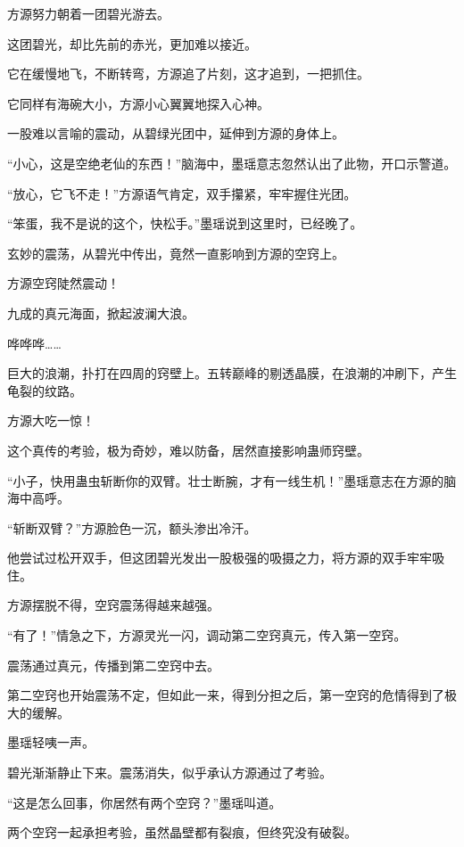 
\begin{this_body}

方源努力朝着一团碧光游去。

这团碧光，却比先前的赤光，更加难以接近。

它在缓慢地飞，不断转弯，方源追了片刻，这才追到，一把抓住。

它同样有海碗大小，方源小心翼翼地探入心神。

一股难以言喻的震动，从碧绿光团中，延伸到方源的身体上。

“小心，这是空绝老仙的东西！”脑海中，墨瑶意志忽然认出了此物，开口示警道。

“放心，它飞不走！”方源语气肯定，双手攥紧，牢牢握住光团。

“笨蛋，我不是说的这个，快松手。”墨瑶说到这里时，已经晚了。

玄妙的震荡，从碧光中传出，竟然一直影响到方源的空窍上。

方源空窍陡然震动！

九成的真元海面，掀起波澜大浪。

哗哗哗……

巨大的浪潮，扑打在四周的窍壁上。五转巅峰的剔透晶膜，在浪潮的冲刷下，产生龟裂的纹路。

方源大吃一惊！

这个真传的考验，极为奇妙，难以防备，居然直接影响蛊师窍壁。

“小子，快用蛊虫斩断你的双臂。壮士断腕，才有一线生机！”墨瑶意志在方源的脑海中高呼。

“斩断双臂？”方源脸色一沉，额头渗出冷汗。

他尝试过松开双手，但这团碧光发出一股极强的吸摄之力，将方源的双手牢牢吸住。

方源摆脱不得，空窍震荡得越来越强。

“有了！”情急之下，方源灵光一闪，调动第二空窍真元，传入第一空窍。

震荡通过真元，传播到第二空窍中去。

第二空窍也开始震荡不定，但如此一来，得到分担之后，第一空窍的危情得到了极大的缓解。

墨瑶轻咦一声。

碧光渐渐静止下来。震荡消失，似乎承认方源通过了考验。

“这是怎么回事，你居然有两个空窍？”墨瑶叫道。

两个空窍一起承担考验，虽然晶壁都有裂痕，但终究没有破裂。


\end{this_body}
